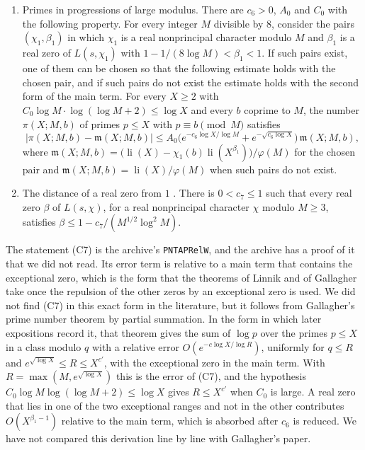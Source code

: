 \documentclass[11pt,letterpaper]{article}
\numberwithin{equation}{section}
\begin{document}
\begin{enumerate}
\item[(C7)] Primes in progressions of large modulus. There are $c_6>0$, $A_0$ and $C_0$ with the following property. For every integer $M$ divisible by $8$, consider the pairs $(\chi_1,\beta_1)$ in which $\chi_1$ is a real nonprincipal character modulo $M$ and $\beta_1$ is a real zero of $L(s,\chi_1)$ with $1-1/(8\log M)<\beta_1<1$. If such pairs exist, one of them can be chosen so that the following estimate holds with the chosen pair, and if such pairs do not exist the estimate holds with the second form of the main term. For every $X\ge2$ with $C_0\log M\cdot\log(\log M+2)\le\log X$ and every $b$ coprime to $M$, the number $\pi(X;M,b)$ of primes $p\le X$ with $p\equiv b\pmod M$ satisfies
\[
\big|\pi(X;M,b)-\mathfrak m(X;M,b)\big|\le A_0\Big(e^{-c_6\log X/\log M}+e^{-\sqrt{c_6\log X}}\Big)\,\mathfrak m(X;M,b),
\]
where $\mathfrak m(X;M,b)=\big(\operatorname{li}(X)-\chi_1(b)\operatorname{li}(X^{\beta_1})\big)/\varphi(M)$ for the chosen pair and $\mathfrak m(X;M,b)=\operatorname{li}(X)/\varphi(M)$ when such pairs do not exist.
\item[(C8)] The distance of a real zero from $1$ \cite[Ch.~14]{davenport}. There is $0<c_7\le1$ such that every real zero $\beta$ of $L(s,\chi)$, for a real nonprincipal character $\chi$ modulo $M\ge3$, satisfies $\beta\le1-c_7/(M^{1/2}\log^2M)$.
\end{enumerate}
The statement (C7) is the archive's \texttt{PNTAPRelW}, and the archive has a proof of it that we did not read. Its error term is relative to a main term that contains the exceptional zero, which is the form that the theorems of Linnik and of Gallagher \cite{gallagher} take once the repulsion of the other zeros by an exceptional zero is used. We did not find (C7) in this exact form in the literature, but it follows from Gallagher's prime number theorem \cite[Theorem~7]{gallagher} by partial summation. In the form in which later expositions record it, that theorem gives the sum of $\log p$ over the primes $p\le X$ in a class modulo $q$ with a relative error $O(e^{-c\log X/\log R})$, uniformly for $q\le R$ and $e^{\sqrt{\log X}}\le R\le X^{c'}$, with the exceptional zero in the main term. With $R=\max(M,e^{\sqrt{\log X}})$ this is the error of (C7), and the hypothesis $C_0\log M\log(\log M+2)\le\log X$ gives $R\le X^{c'}$ when $C_0$ is large. A real zero that lies in one of the two exceptional ranges and not in the other contributes $O(X^{\beta_1-1})$ relative to the main term, which is absorbed after $c_6$ is reduced. We have not compared this derivation line by line with Gallagher's paper.
\end{document}
